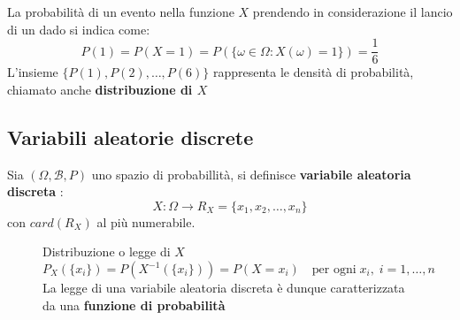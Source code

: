 \documentclass[a4paper]{article}
\theoremstyle{break}
\theoremstyle{break}
\theoremstyle{break}
\theoremstyle{break}
\begin{document}
\vspace{1em}
\noindent La probabilità di un evento nella funzione \( X \) prendendo in considerazione
il lancio di un dado si indica come:
\[
P(1) = P(X = 1) = P(\{\omega \in \Omega: X(\omega) = 1\} ) = \frac{1}{6}
\] 
L'insieme \( \{P(1), P(2), \ldots, P(6)\} \) rappresenta le densità di probabilità,
chiamato anche \textbf{distribuzione di \( X \) }

\subsection{Variabili aleatorie discrete}
Sia \( (\Omega, \mathcal{B}, P) \) uno spazio di probabillità, si definisce \textbf{
  variabile aleatoria discreta
}:
\[
X : \Omega \to R_X = \{x_1, x_2, \ldots, x_n\} 
\] 
con \( card(R_X) \) al più numerabile.

\begin{figure}[H]
  \begin{definition}
    Distribuzione o legge di \( X \) 
    \[
      P_X(\{x_i\} ) = P(X^{-1}(\{x_i\} )) = P(X=x_i) \quad \text{per ogni} \; x_i,\; i = 1, \ldots, n
    \] 
    La legge di una variabile aleatoria discreta è dunque caratterizzata da una
    \textbf{funzione di probabilità}
  \end{definition}
\end{figure}
\end{document}
